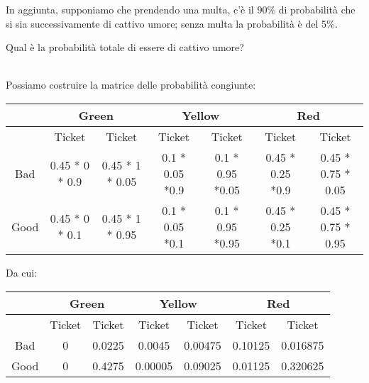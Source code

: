 \documentclass{article}
\begin{document}
	In aggiunta, supponiamo che prendendo una multa, c’è
	il 90\% di probabilità che si sia successivamente di
	cattivo umore; senza multa la probabilità è del 5\%.
	
	Qual è la probabilità totale di essere di cattivo umore?
	\\
	\vspace{2cm}
	\\
	\begin{center}
	\end{center}		    

Possiamo costruire la matrice delle probabilità congiunte:
\begin{center}
	\begin{tabular}{ |c|c|c|c|c|c|c| } 
		\hline
		 & \multicolumn{2}{|c|}{Green} & \multicolumn{2}{|c|}{Yellow} & \multicolumn{2}{|c|}{Red} 
		\\ \hline
		& Ticket & \lnot Ticket & Ticket &  \lnot Ticket & Ticket & \lnot Ticket 
		\\ \hline
		Bad  & 0.45 * 0 * 0.9 &  0.45 * 1 * 0.05  & 0.1 * 0.05 *0.9  & 0.1 * 0.95 *0.05  & 0.45 * 0.25 *0.9 &  0.45 * 0.75 * 0.05
		\\ \hline
		Good & 0.45 * 0 * 0.1 &  0.45 * 1 * 0.95  & 0.1 * 0.05 *0.1  & 0.1 * 0.95 *0.95  & 0.45 * 0.25 *0.1 &  0.45 * 0.75 * 0.95
		\\ \hline
	\end{tabular}
\end{center}

Da cui:

\begin{center}
	\begin{tabular}{ |c|c|c|c|c|c|c| } 
		\hline
		& \multicolumn{2}{|c|}{Green} & \multicolumn{2}{|c|}{Yellow} & \multicolumn{2}{|c|}{Red} 
		\\ \hline
		& Ticket & \lnot Ticket & Ticket &  \lnot Ticket & Ticket & \lnot Ticket 
		\\ \hline
		Bad  & 0  & 0.0225  &  0.0045  & 0.00475  & 0.10125  &  0.016875
		\\ \hline
		Good & 0  & 0.4275  &  0.00005 & 0.09025  & 0.01125  &  0.320625
		\\ \hline
	\end{tabular}
\end{center}
\end{document}
